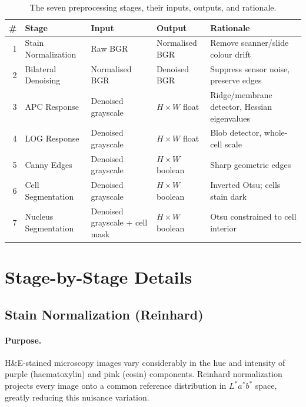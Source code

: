 \documentclass[conference,10pt]{IEEEtran}
\begin{document}
\begin{table}[t]
  \centering
  \caption{The seven preprocessing stages, their inputs, outputs, and rationale.}
  \label{tab:stages}
  \begin{tabular}{@{}rlllp{5.5cm}@{}}
    \toprule
    \# & Stage                  & Input                & Output                            & Rationale \\
    \midrule
    1  & Stain Normalization    & Raw BGR              & Normalised BGR                    & Remove scanner/slide colour drift \\
    2  & Bilateral Denoising    & Normalised BGR       & Denoised BGR                      & Suppress sensor noise, preserve edges \\
    3  & APC Response           & Denoised grayscale   & $H \times W$ float                & Ridge/membrane detector, Hessian eigenvalues \\
    4  & LOG Response           & Denoised grayscale   & $H \times W$ float                & Blob detector, whole-cell scale \\
    5  & Canny Edges            & Denoised grayscale   & $H \times W$ boolean              & Sharp geometric edges \\
    6  & Cell Segmentation      & Denoised grayscale   & $H \times W$ boolean              & Inverted Otsu; cells stain dark \\
    7  & Nucleus Segmentation   & Denoised grayscale + cell mask & $H \times W$ boolean    & Otsu constrained to cell interior \\
    \bottomrule
  \end{tabular}
\end{table}

\section{Stage-by-Stage Details}
\label{sec:stages}

\subsection{Stain Normalization (Reinhard)}
\label{sec:stain}

\paragraph{Purpose.} H\&E-stained microscopy images vary considerably in the hue and intensity of purple (haematoxylin) and pink (eosin) components. Reinhard normalization projects every image onto a common reference distribution in $L^*a^*b^*$ space, greatly reducing this nuisance variation.
\end{document}
